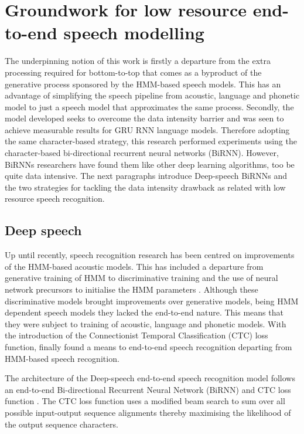 \section{Groundwork for low resource end-to-end speech modelling}
The underpinning notion of this work is firstly a departure from the extra processing required for  bottom-to-top that comes as a byproduct of the generative process sponsored by the HMM-based speech models. This has an advantage of simplifying the speech pipeline from acoustic, language and phonetic model to just a speech model that approximates the same process.  Secondly, the model developed seeks to overcome the data intensity barrier and was seen to achieve measurable results for GRU RNN language models.  Therefore adopting the same character-based strategy, this research performed experiments using the character-based bi-directional recurrent neural networks (BiRNN).  However, BiRNNs researchers have found them like other deep learning algorithms, too be quite data intensive\cite{hannun2014deep}.  The next paragraphs introduce Deep-speech BiRNNs and the two strategies for tackling the data intensity drawback as related with low resource speech recognition.

\subsection{Deep speech}
Up until recently, speech recognition research has been centred on improvements of the HMM-based acoustic models.  This has included a departure from generative training of HMM to discriminative training \citep{woodland2000large} and the use of neural network precursors to initialise the HMM parameters \citep{mohamed2012acoustic}.  Although these  discriminative models brought improvements over generative models, being HMM dependent speech models they lacked the end-to-end nature.  This means that they were subject to training of acoustic, language and phonetic models.  With the introduction of the Connectionist Temporal Classification (CTC) loss  function, \cite{graves2014towards} finally found a means to end-to-end speech recognition departing from HMM-based speech recognition. 

The architecture of the Deep-speech end-to-end speech recognition model \cite{hannun2014first} follows an end-to-end Bi-directional Recurrent Neural Network (BiRNN) and CTC loss function \citep{graves2006connectionist}.  The CTC loss function uses a modified beam search to sum over all possible input-output sequence alignments thereby maximising the likelihood of the output sequence characters.

